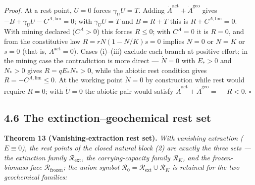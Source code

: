 \documentclass[11pt]{article}
\begin{document}
\emph{Proof.} At a rest point, \(\dot U = 0\) forces \(\gamma_U U = T\). Adding \(\dot A^{\mathrm{act}} +\allowbreak{} \dot A^{\mathrm{geo}}\) gives \(-B +\allowbreak{} \gamma_U U - C^{A,\allowbreak{}\mathrm{lim}} =\allowbreak{} 0\); with \(\gamma_U U = T\) and \(B = R + T\) this is \(R + C^{A,\mathrm{lim}} = 0\). With mining declared (\(C^A > 0\)) this forces \(R \le 0\); with \(C^A = 0\) it is \(R = 0\), and from the constitutive law \(R =\allowbreak{} rN(1 - N/\allowbreak{}K)s =\allowbreak{} 0\) implies \(N = 0\) or \(N = K\) or \(s = 0\) (that is, \(A^{\mathrm{act}} = 0\)). Cases (i)--(iii) exclude each branch at positive effort; in the mining case the contradiction is more direct --- \(\dot N = 0\) with \(E_* > 0\) and \(N_* > 0\) gives \(R = qE_*N_* > 0\), while the abiotic rest condition gives \(R = -C^{A,\mathrm{lim}} \le 0\). At the working point \(\dot N = 0\) by construction while rest would require \(R = 0\); with \(\dot U = 0\) the abiotic pair would satisfy \(\dot A^{\mathrm{act}} +\allowbreak{} \dot A^{\mathrm{geo}} =\allowbreak{} -R < 0\). \(\square\)

\subsection*{4.6 The extinction--geochemical rest set}\label{46-the-extinction--geochemical-rest-set}

\textbf{Theorem 13 (Vanishing-extraction rest set).} \emph{With vanishing extraction (\(E \equiv 0\)), the rest points of the closed natural block (2) are exactly the three sets --- the extinction family \(\mathcal{R}_{\mathrm{ext}}\), the carrying-capacity family \(\mathcal{R}_K\), and the frozen-biomass face \(\mathcal{R}_{\mathrm{frozen}}\); the union symbol \(\mathcal{R}_0 =\allowbreak{} \mathcal{R}_{\mathrm{ext}} \cup \mathcal{R}_K\) is retained for the two geochemical families:} 

\par\noindent{}\par
\end{document}
